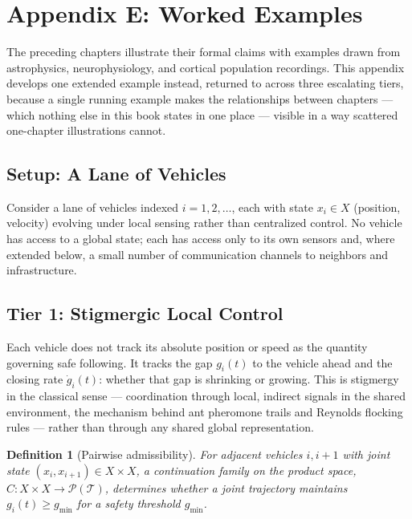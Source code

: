 \documentclass[12pt]{report}
\newtheorem{definition}{Definition}[section]
\begin{document}
\chapter*{Appendix E: Worked Examples}

The preceding chapters illustrate their formal claims with examples
drawn from astrophysics, neurophysiology, and cortical population
recordings. This appendix develops one extended example instead,
returned to across three escalating tiers, because a single running
example makes the relationships between chapters --- which nothing else
in this book states in one place --- visible in a way scattered
one-chapter illustrations cannot.

\section*{Setup: A Lane of Vehicles}

Consider a lane of vehicles indexed $i = 1, 2, \ldots$, each with state
$x_i \in X$ (position, velocity) evolving under local sensing rather
than centralized control. No vehicle has access to a global state; each
has access only to its own sensors and, where extended below, a small
number of communication channels to neighbors and infrastructure.

\section*{Tier 1: Stigmergic Local Control}

Each vehicle does not track its absolute position or speed as the
quantity governing safe following. It tracks the gap $g_i(t)$ to the
vehicle ahead and the closing rate $\dot{g}_i(t)$: whether that gap is
shrinking or growing. This is stigmergy in the classical sense ---
coordination through local, indirect signals in the shared environment,
the mechanism behind ant pheromone trails and Reynolds flocking rules
--- rather than through any shared global representation.

\begin{definition}[Pairwise admissibility]
For adjacent vehicles $i, i+1$ with joint state $(x_i, x_{i+1}) \in X
\times X$, a continuation family on the product space, $C : X \times X
\to \mathcal{P}(\mathcal{T})$, determines whether a joint trajectory
maintains $g_i(t) \geq g_{\min}$ for a safety threshold $g_{\min}$.
\end{definition}
\end{document}
